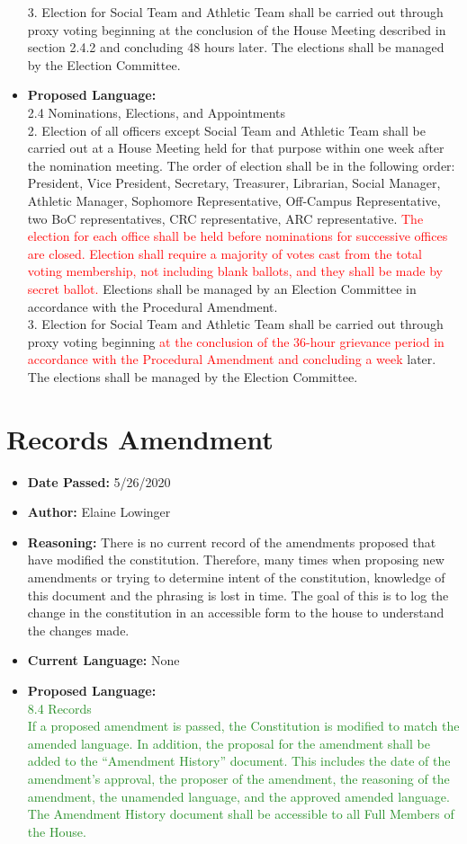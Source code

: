 \documentclass[10pt]{article} %
\begin{document}
\begin{itemize}
	3. Election for Social Team and Athletic Team shall be carried out through proxy voting beginning at the conclusion of the House Meeting described in section 2.4.2 and concluding 48 hours later. The elections shall be managed by the Election Committee. 
	\item \textbf{Proposed Language:} \\
	2.4 Nominations, Elections, and Appointments \\
	2. Election of all officers except Social Team and Athletic Team shall be carried out at a House Meeting held for that purpose within one week after the nomination meeting. The order of election shall be in the following order: President, Vice President, Secretary, Treasurer, Librarian, Social Manager, Athletic Manager, Sophomore Representative, Off-Campus Representative, two BoC representatives, CRC representative, ARC representative. \textcolor{red}{The election for each office shall be held before nominations for successive offices are closed. Election shall require a majority of votes cast from the total voting membership, not including blank ballots, and they shall be made by secret ballot.} Elections shall be managed by an Election Committee in accordance with the Procedural Amendment. \\
	3. Election for Social Team and Athletic Team shall be carried out through proxy voting beginning \textcolor{red}{at the conclusion of the 36-hour grievance period in accordance with the Procedural Amendment and concluding a week} later. The elections shall be managed by the Election Committee. 
\end{itemize}

\section{Records Amendment}
\begin{itemize}
	\item \textbf{Date Passed:} 5/26/2020
	\item \textbf{Author:} Elaine Lowinger
	\item \textbf{Reasoning:} There is no current record of the amendments proposed that have modified the constitution. Therefore, many times when proposing new amendments or trying to determine intent of the constitution, knowledge of this document and the phrasing is lost in time. The goal of this is to log the change in the constitution in an accessible form to the house to understand the changes made. 
	\item \textbf{Current Language:} None
	\item \textbf{Proposed Language:} \\
	\textcolor{ForestGreen}{
	8.4 Records \\
	If a proposed amendment is passed, the Constitution is modified to match the amended language. In addition, the proposal for the amendment shall be added to the “Amendment History” document. This includes the date of the amendment's approval, the proposer of the amendment, the reasoning of the amendment, the unamended language, and the approved amended language. The Amendment History document shall be accessible to all Full Members of the House.}
\end{itemize}
\end{document}
